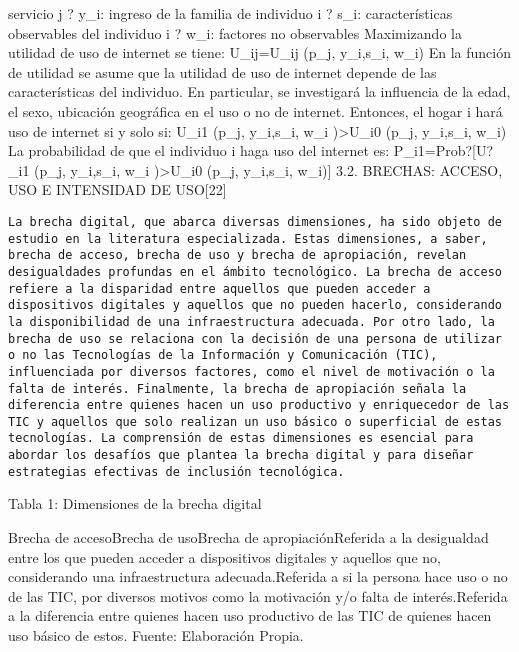 \begin{enumerate}
  servicio j ? y\_i: ingreso de la familia de individuo i ? s\_i:
  características observables del individuo i ? w\_i: factores no
  observables Maximizando la utilidad de uso de internet se tiene:
  U\_ij=U\_ij (p\_j, y\_i,s\_i, w\_i) En la función de utilidad se asume
  que la utilidad de uso de internet depende de las características del
  individuo. En particular, se investigará la influencia de la edad, el
  sexo, ubicación geográfica en el uso o no de internet. Entonces, el
  hogar i hará uso de internet si y solo si: U\_i1 (p\_j, y\_i,s\_i,
  w\_i )\textgreater U\_i0 (p\_j, y\_i,s\_i, w\_i) La probabilidad de
  que el individuo i haga uso del internet es: P\_i1=Prob?{[}U?\_i1
  (p\_j, y\_i,s\_i, w\_i )\textgreater U\_i0 (p\_j, y\_i,s\_i, w\_i){]}
  3.2. BRECHAS: ACCESO, USO E INTENSIDAD DE USO{[}22{]}

\begin{verbatim}
La brecha digital, que abarca diversas dimensiones, ha sido objeto de estudio en la literatura especializada. Estas dimensiones, a saber, brecha de acceso, brecha de uso y brecha de apropiación, revelan desigualdades profundas en el ámbito tecnológico. La brecha de acceso refiere a la disparidad entre aquellos que pueden acceder a dispositivos digitales y aquellos que no pueden hacerlo, considerando la disponibilidad de una infraestructura adecuada. Por otro lado, la brecha de uso se relaciona con la decisión de una persona de utilizar o no las Tecnologías de la Información y Comunicación (TIC), influenciada por diversos factores, como el nivel de motivación o la falta de interés. Finalmente, la brecha de apropiación señala la diferencia entre quienes hacen un uso productivo y enriquecedor de las TIC y aquellos que solo realizan un uso básico o superficial de estas tecnologías. La comprensión de estas dimensiones es esencial para abordar los desafíos que plantea la brecha digital y para diseñar estrategias efectivas de inclusión tecnológica.
\end{verbatim}
\end{enumerate}

Tabla 1: Dimensiones de la brecha digital

Brecha de accesoBrecha de usoBrecha de apropiaciónReferida a la
desigualdad entre los que pueden acceder a dispositivos digitales y
aquellos que no, considerando una infraestructura adecuada.Referida a si
la persona hace uso o no de las TIC, por diversos motivos como la
motivación y/o falta de interés.Referida a la diferencia entre quienes
hacen uso productivo de las TIC de quienes hacen uso básico de estos.
Fuente: Elaboración Propia.

